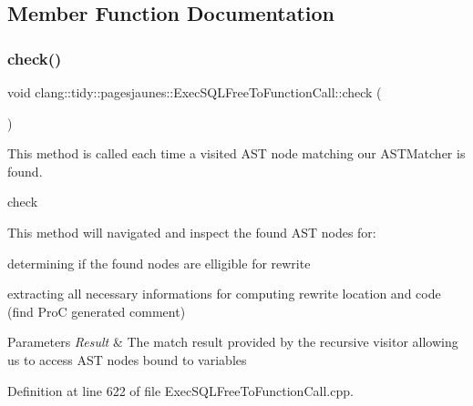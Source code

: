 \subsection{Member Function Documentation}
\mbox{\label{classclang_1_1tidy_1_1pagesjaunes_1_1_exec_s_q_l_free_to_function_call_a98daafcadf9abd6eaec0eafc555b4c5a}} 
\subsubsection{\texorpdfstring{check()}{check()}}
{\footnotesize\ttfamily void clang\+::tidy\+::pagesjaunes\+::\+Exec\+S\+Q\+L\+Free\+To\+Function\+Call\+::check (\begin{DoxyParamCaption}\item[{const ast\+\_\+matchers\+::\+Match\+Finder\+::\+Match\+Result \&}]{ }\end{DoxyParamCaption})\hspace{0.3cm}{\ttfamily [override]}}



This method is called each time a visited A\+ST node matching our A\+S\+T\+Matcher is found. 

check

This method will navigated and inspect the found A\+ST nodes for\+:
\begin{DoxyItemize}
\item determining if the found nodes are elligible for rewrite
\item extracting all necessary informations for computing rewrite location and code (find ProC generated comment)
\end{DoxyItemize}


\begin{DoxyParams}{Parameters}
{\em Result} & The match result provided by the recursive visitor allowing us to access A\+ST nodes bound to variables \\
\hline
\end{DoxyParams}


Definition at line 622 of file Exec\+S\+Q\+L\+Free\+To\+Function\+Call.\+cpp.

